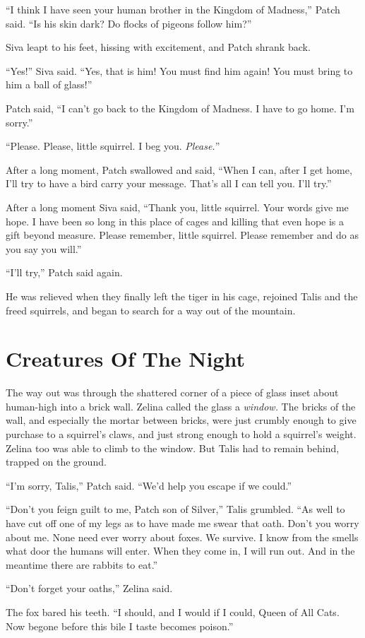 \documentclass[ebook,oneside,openany,17pt]{memoir}
\renewcommand{\thechapter}{\Roman{chapter}}
\newcounter{sections}
\newcommand{\sections}[1]{%
  \section*{#1}
  \addtocounter{sections}{1}%
  \pdfbookmark[1]{#1}{section.\thechapter.\thesections}}
\begin{document}
“I think I have seen your human brother in the Kingdom of Madness,”
Patch said. “Is his skin dark? Do flocks of pigeons follow him?”

Siva leapt to his feet, hissing with excitement, and Patch shrank
back.

“Yes!” Siva said. “Yes, that is him! You must find him again! You must
bring to him a ball of glass!”

Patch said, “I can’t go back to the Kingdom of Madness. I have to go
home. I’m sorry.”

“Please. Please, little squirrel. I beg you. \emph{Please.}”

After a long moment, Patch swallowed and said, “When I can, after I
get home, I’ll try to have a bird carry your message. That’s all I can
tell you. I’ll try.”

After a long moment Siva said, “Thank you, little squirrel. Your words
give me hope. I have been so long in this place of cages and killing
that even hope is a gift beyond measure. Please remember, little
squirrel. Please remember and do as you say you will.”

“I’ll try,” Patch said again.

He was relieved when they finally left the tiger in his cage, rejoined
Talis and the freed squirrels, and began to search for a way out of
the mountain.


\sections{Creatures Of The Night}

The way out was through the shattered corner of a piece of glass inset
about human-high into a brick wall. Zelina called the glass a
\emph{window.} The bricks of the wall, and especially the mortar
between bricks, were just crumbly enough to give purchase to a
squirrel’s claws, and just strong enough to hold a squirrel’s
weight. Zelina too was able to climb to the window. But Talis had to
remain behind, trapped on the ground.

“I’m sorry, Talis,” Patch said. “We’d help you escape if we could.”

“Don’t you feign guilt to me, Patch son of Silver,” Talis
grumbled. “As well to have cut off one of my legs as to have made me
swear that oath. Don’t you worry about me. None need ever worry about
foxes. We survive. I know from the smells what door the humans will
enter. When they come in, I will run out. And in the meantime there
are rabbits to eat.”

“Don’t forget your oaths,” Zelina said.

The fox bared his teeth. “I should, and I would if I could, Queen of
All Cats. Now begone before this bile I taste becomes poison.”
\end{document}
